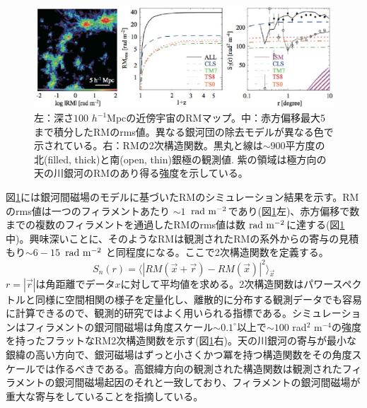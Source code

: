 \begin{figure}[tbp]
\begin{center}
\includegraphics[width=1.0\linewidth]{magnetism/c06.s2.ss6.f1.eps}
\end{center}
\caption{左：深さ$100$ $h^{-1}$Mpcの近傍宇宙のRMマップ\citep{2010ApJ...723..476A}。中：赤方偏移最大5まで積分したRMのrms値\citep{2011ApJ...738..134A}。異なる銀河団の除去モデルが異なる色で示されている。右：RMの2次構造関数。黒丸\citep{2010ApJ...714.1170M}と線\citep{2011ApJ...726....4S}は$\sim 900$平方度の
北(filled, thick)と南(open, thin)銀極の観測値. 紫の領域は極方向の天の川銀河のRMのあり得る強度を示している\citep{2013ApJ...767..150A}。
}\label{c06.s2.ss6.f1}
\end{figure}

図\ref{c06.s2.ss6.f1}には銀河間磁場のモデルに基づいたRMのシミュレーション結果を示す。RMのrms値は一つのフィラメントあたり $\sim 1$~${\rm rad~m^{-2}}$であり(図\ref{c06.s2.ss6.f1}左)、赤方偏移で数までの複数のフィラメントを通過したRMのrms値は数 ${\rm rad~m^{-2}}$に達する(図\ref{c06.s2.ss6.f1}中)。興味深いことに、そのようなRMは観測されたRMの系外からの寄与の見積もり$\sim 6-15$~${\rm rad~m^{-2}}$ \citep{2010MNRAS.409L..99S,1209.1438v2}と同程度になる。ここで2次構造関数を定義する。
\begin{equation}
S_n(r)=\langle|RM(\vec{x}+\vec{r})-RM(\vec{x})|^2\rangle _{\vec{x}}
\end{equation}
$r=|\vec{r}|$は角距離でデータ$x$に対して平均値を求める。2次構造関数はパワースペクトルと同様に空間相関の様子を定量化し、離散的に分布する観測データでも容易に計算できるので、観測的研究ではよく用いられる指標である。シミュレーションはフィラメントの銀河間磁場は角度スケール$\sim 0.1^\circ$以上で$\sim 100$ rad$^2$ m$^{-4}$の強度を持ったフラットなRM2次構造関数を示す(図\ref{c06.s2.ss6.f1}右)。天の川銀河の寄与が最小な銀緯の高い方向で、銀河磁場はずっと小さくかつ冪を持つ構造関数をその角度スケールでは作るべきである\citep{2013ApJ...767..150A}。高銀緯方向の観測された構造関数は観測されたフィラメントの銀河間磁場起因のそれと一致しており\citep{2010ApJ...714.1170M,2011ApJ...726....4S}、フィラメントの銀河間磁場が重大な寄与をしていることを指摘している。


